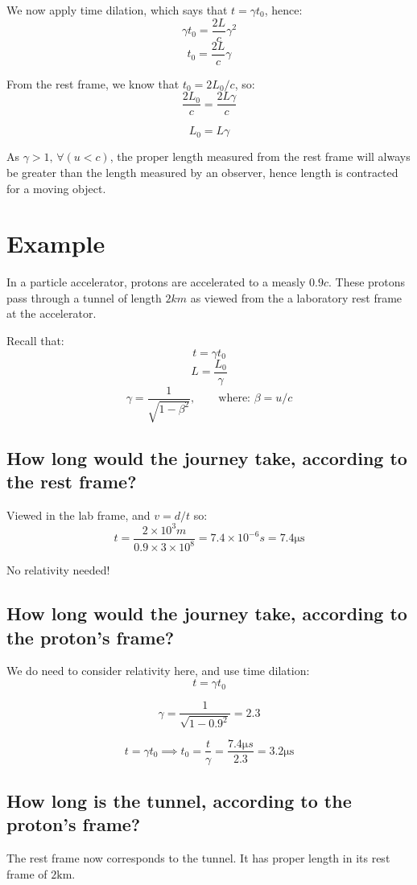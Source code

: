 We now apply time dilation, which says that $t = \gamma t_0$, hence:
\[
    \gamma t_0 = \frac{2L}{c} \gamma^2
\]
\[
    t_0 = \frac{2L}{c} \gamma
\]

From the rest frame, we know that $t_0 = 2L_0 / c$, so:
\[
    \frac{2L_0}{c} = \frac{2L \gamma}{c}
\]

\[
    L_0 = L \gamma
\]

As $\gamma > 1, \, \forall (u < c)$, the proper length measured from the rest frame will always be greater than the length measured by an observer, hence length is contracted for a moving object. 

\section{Example}
In a particle accelerator, protons are accelerated to a measly $0.9c$. These protons pass through a tunnel of length $2 \si{km}$ as viewed from the a laboratory rest frame at the accelerator.

Recall that:
\[
    t = \gamma t_0
\]
\[
    L = \frac{L_0}{\gamma}
\]
\[
    \gamma = \frac{1}{\sqrt{1 - \beta^2}}, \qquad \text{where: } \beta = u/c
\]


\subsection{How long would the journey take, according to the rest frame?}
Viewed in the lab frame, and $v = d/t$ so:
\[
    t = \frac{2 \times 10^3 \si{m}}{0.9 \times 3 \times 10^8} = 7.4 \times 10^{-6}\si{s} = 7.4 \si{\micro \second}
\]

No relativity needed! 

\subsection{How long would the journey take, according to the proton's frame?}
We do need to consider relativity here, and use time dilation:
\[
    t = \gamma t_0
\]

\[
    \gamma = \frac{1}{\sqrt{1 - 0.9^2}} = 2.3
\]

\[
    t = \gamma t_0 \implies t_0 = \frac{t}{\gamma} = \frac{7.4 \si{\micro s}}{2.3} = 3.2 \si{\micro\second}
\]

\subsection{How long is the tunnel, according to the proton's frame?}
The rest frame now corresponds to the tunnel. It has proper length in its rest frame of $2 \si{\kilo \metre}$.

